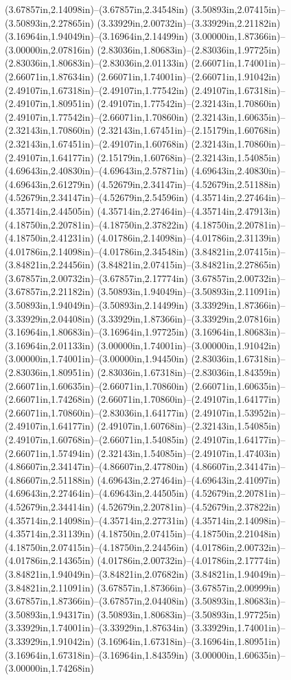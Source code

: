 (3.67857in,2.14098in)--(3.67857in,2.34548in) (3.50893in,2.07415in)--(3.50893in,2.27865in) (3.33929in,2.00732in)--(3.33929in,2.21182in) (3.16964in,1.94049in)--(3.16964in,2.14499in) (3.00000in,1.87366in)--(3.00000in,2.07816in) (2.83036in,1.80683in)--(2.83036in,1.97725in) (2.83036in,1.80683in)--(2.83036in,2.01133in) (2.66071in,1.74001in)--(2.66071in,1.87634in) (2.66071in,1.74001in)--(2.66071in,1.91042in) (2.49107in,1.67318in)--(2.49107in,1.77542in) (2.49107in,1.67318in)--(2.49107in,1.80951in) (2.49107in,1.77542in)--(2.32143in,1.70860in) (2.49107in,1.77542in)--(2.66071in,1.70860in) (2.32143in,1.60635in)--(2.32143in,1.70860in) (2.32143in,1.67451in)--(2.15179in,1.60768in) (2.32143in,1.67451in)--(2.49107in,1.60768in) (2.32143in,1.70860in)--(2.49107in,1.64177in) (2.15179in,1.60768in)--(2.32143in,1.54085in) (4.69643in,2.40830in)--(4.69643in,2.57871in) (4.69643in,2.40830in)--(4.69643in,2.61279in) (4.52679in,2.34147in)--(4.52679in,2.51188in) (4.52679in,2.34147in)--(4.52679in,2.54596in) (4.35714in,2.27464in)--(4.35714in,2.44505in) (4.35714in,2.27464in)--(4.35714in,2.47913in) (4.18750in,2.20781in)--(4.18750in,2.37822in) (4.18750in,2.20781in)--(4.18750in,2.41231in) (4.01786in,2.14098in)--(4.01786in,2.31139in) (4.01786in,2.14098in)--(4.01786in,2.34548in) (3.84821in,2.07415in)--(3.84821in,2.24456in) (3.84821in,2.07415in)--(3.84821in,2.27865in) (3.67857in,2.00732in)--(3.67857in,2.17774in) (3.67857in,2.00732in)--(3.67857in,2.21182in) (3.50893in,1.94049in)--(3.50893in,2.11091in) (3.50893in,1.94049in)--(3.50893in,2.14499in) (3.33929in,1.87366in)--(3.33929in,2.04408in) (3.33929in,1.87366in)--(3.33929in,2.07816in) (3.16964in,1.80683in)--(3.16964in,1.97725in) (3.16964in,1.80683in)--(3.16964in,2.01133in) (3.00000in,1.74001in)--(3.00000in,1.91042in) (3.00000in,1.74001in)--(3.00000in,1.94450in) (2.83036in,1.67318in)--(2.83036in,1.80951in) (2.83036in,1.67318in)--(2.83036in,1.84359in) (2.66071in,1.60635in)--(2.66071in,1.70860in) (2.66071in,1.60635in)--(2.66071in,1.74268in) (2.66071in,1.70860in)--(2.49107in,1.64177in) (2.66071in,1.70860in)--(2.83036in,1.64177in) (2.49107in,1.53952in)--(2.49107in,1.64177in) (2.49107in,1.60768in)--(2.32143in,1.54085in) (2.49107in,1.60768in)--(2.66071in,1.54085in) (2.49107in,1.64177in)--(2.66071in,1.57494in) (2.32143in,1.54085in)--(2.49107in,1.47403in) (4.86607in,2.34147in)--(4.86607in,2.47780in) (4.86607in,2.34147in)--(4.86607in,2.51188in) (4.69643in,2.27464in)--(4.69643in,2.41097in) (4.69643in,2.27464in)--(4.69643in,2.44505in) (4.52679in,2.20781in)--(4.52679in,2.34414in) (4.52679in,2.20781in)--(4.52679in,2.37822in) (4.35714in,2.14098in)--(4.35714in,2.27731in) (4.35714in,2.14098in)--(4.35714in,2.31139in) (4.18750in,2.07415in)--(4.18750in,2.21048in) (4.18750in,2.07415in)--(4.18750in,2.24456in) (4.01786in,2.00732in)--(4.01786in,2.14365in) (4.01786in,2.00732in)--(4.01786in,2.17774in) (3.84821in,1.94049in)--(3.84821in,2.07682in) (3.84821in,1.94049in)--(3.84821in,2.11091in) (3.67857in,1.87366in)--(3.67857in,2.00999in) (3.67857in,1.87366in)--(3.67857in,2.04408in) (3.50893in,1.80683in)--(3.50893in,1.94317in) (3.50893in,1.80683in)--(3.50893in,1.97725in) (3.33929in,1.74001in)--(3.33929in,1.87634in) (3.33929in,1.74001in)--(3.33929in,1.91042in) (3.16964in,1.67318in)--(3.16964in,1.80951in) (3.16964in,1.67318in)--(3.16964in,1.84359in) (3.00000in,1.60635in)--(3.00000in,1.74268in) 